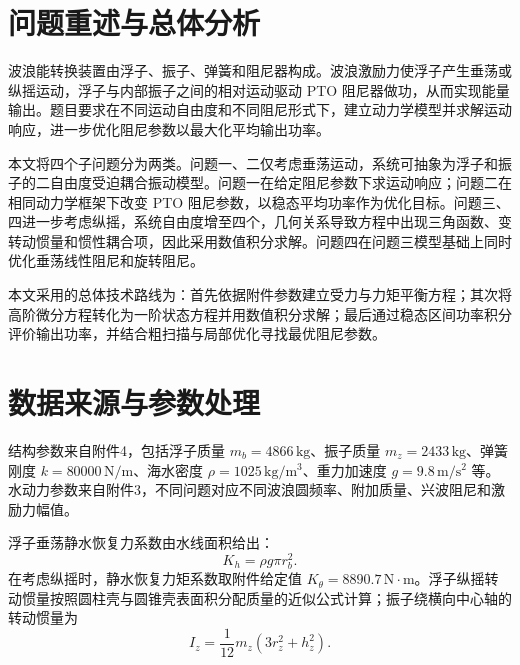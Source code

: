 \section{问题重述与总体分析}

波浪能转换装置由浮子、振子、弹簧和阻尼器构成。波浪激励力使浮子产生垂荡或纵摇运动，浮子与内部振子之间的相对运动驱动 PTO 阻尼器做功，从而实现能量输出。题目要求在不同运动自由度和不同阻尼形式下，建立动力学模型并求解运动响应，进一步优化阻尼参数以最大化平均输出功率。

本文将四个子问题分为两类。问题一、二仅考虑垂荡运动，系统可抽象为浮子和振子的二自由度受迫耦合振动模型。问题一在给定阻尼参数下求运动响应；问题二在相同动力学框架下改变 PTO 阻尼参数，以稳态平均功率作为优化目标。问题三、四进一步考虑纵摇，系统自由度增至四个，几何关系导致方程中出现三角函数、变转动惯量和惯性耦合项，因此采用数值积分求解。问题四在问题三模型基础上同时优化垂荡线性阻尼和旋转阻尼。

本文采用的总体技术路线为：首先依据附件参数建立受力与力矩平衡方程；其次将高阶微分方程转化为一阶状态方程并用数值积分求解；最后通过稳态区间功率积分评价输出功率，并结合粗扫描与局部优化寻找最优阻尼参数。

\section{数据来源与参数处理}

结构参数来自附件4，包括浮子质量 $m_b=4866\,\mathrm{kg}$、振子质量 $m_z=2433\,\mathrm{kg}$、弹簧刚度 $k=80000\,\mathrm{N/m}$、海水密度 $\rho=1025\,\mathrm{kg/m^3}$、重力加速度 $g=9.8\,\mathrm{m/s^2}$ 等。水动力参数来自附件3，不同问题对应不同波浪圆频率、附加质量、兴波阻尼和激励力幅值。

浮子垂荡静水恢复力系数由水线面积给出：
\begin{equation}
  K_h=\rho g\pi r_b^2 .
  \label{eq:kh}
\end{equation}
在考虑纵摇时，静水恢复力矩系数取附件给定值 $K_\theta=8890.7\,\mathrm{N\cdot m}$。浮子纵摇转动惯量按照圆柱壳与圆锥壳表面积分配质量的近似公式计算；振子绕横向中心轴的转动惯量为
\begin{equation}
  I_z=\frac{1}{12}m_z(3r_z^2+h_z^2).
  \label{eq:iz}
\end{equation}
